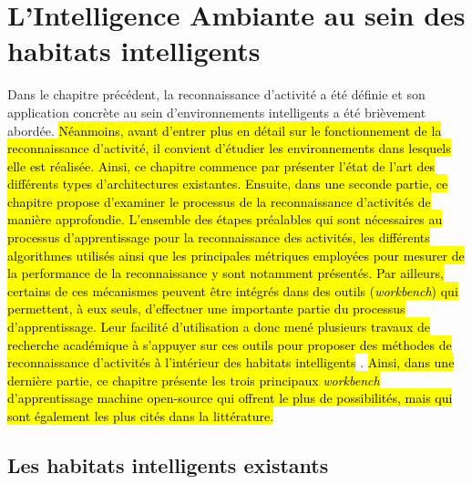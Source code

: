 \chapter{L'Intelligence Ambiante au sein des habitats intelligents}
\label{chap:2}

Dans le chapitre précédent, la reconnaissance d'activité a été définie et son application concrète au sein d'environnements intelligents a été brièvement abordée. \hl{Néanmoins, avant d'entrer plus en détail sur le fonctionnement de la reconnaissance d'activité, il convient d'étudier les environnements dans lesquels elle est réalisée. Ainsi, ce chapitre commence par présenter l'état de l'art des différents types d'architectures existantes. Ensuite,  dans une seconde partie, ce chapitre propose d'examiner le processus de la reconnaissance d'activités de manière approfondie. L'ensemble des étapes préalables qui sont nécessaires au processus d'apprentissage pour la reconnaissance des activités, les différents algorithmes utilisés ainsi que les principales métriques employées pour mesurer de la performance de la reconnaissance y sont notamment présentés. Par ailleurs, certains de ces mécanismes peuvent être intégrés dans des outils (\textit{workbench}) qui permettent, à eux seuls, d'effectuer une importante partie du processus d'apprentissage. Leur facilité d'utilisation a donc mené plusieurs travaux de recherche académique à s'appuyer sur ces outils pour proposer des méthodes de reconnaissance d’activités à l’intérieur des habitats intelligents} \citep{Maurer2006, Shoaib2013, Ramirez-Prado2019}. \hl{Ainsi, dans une dernière partie, ce chapitre présente les trois principaux \textit{workbench} d’apprentissage machine open-source qui offrent le plus de possibilités, mais qui sont également les plus cités dans la littérature.}

\section{Les habitats intelligents existants}

